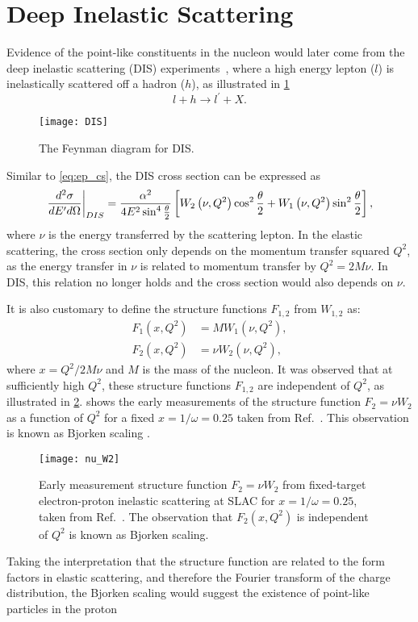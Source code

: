 \documentclass[../main.tex]{subfiles}
\begin{document}
\section{Deep Inelastic Scattering}
\label{sec:dis}
Evidence of the point-like constituents in the nucleon would later come from the deep
inelastic scattering (DIS) experiments~\cite{breidenbach1969}, where a high
energy lepton ($l$) is inelastically scattered off a hadron ($h$), as
illustrated in \cref{fig:DIS}
\begin{equation}
	l + h \rightarrow l^\prime + X.
\end{equation}
\begin{figure}[htbp!]
	\centering
	\texttt{[image: DIS]}
	\caption{The Feynman diagram for DIS.}
	\label{fig:DIS}
\end{figure}
Similar to \cref{eq:ep_cs}, the DIS cross section can be expressed as
\begin{equation}
	\eval{\frac{d^2\sigma}{dE^\prime d\Omega}}_{DIS} = \frac{\alpha^2}{4E^2 \sin^4
		\frac{\theta}{2}} \left[ W_2\left(\nu,Q^2\right)\cos^2
		\frac{\theta}{2} + W_1\left(\nu,Q^2\right)\sin^2 \frac{\theta}{2}
		\right],
	\label{eq:DIS_cs1}
\end{equation}
where $\nu$ is the energy transferred by the scattering lepton.
In the elastic scattering, the cross section only depends on the momentum transfer squared $Q^2$,
as the energy transfer in $\nu$ is related to momentum transfer by $Q^2=2M\nu$.
In DIS, this relation no longer holds and the cross section would also depends on $\nu$.

It is also customary to define the structure functions $F_{1,2}$ from $W_{1,2}$ as:
\begin{equation}
	\begin{split}
		F_1\left(x,Q^2\right) &= MW_1\left(\nu,Q^2\right),\\
		F_2\left(x,Q^2\right) &= \nu W_2\left(\nu,Q^2\right),
	\end{split}
\end{equation}
where $x=Q^2/2M\nu$ and $M$ is the mass of the nucleon. It was observed that at sufficiently high $Q^2$,
these structure functions $F_{1,2}$ are independent of $Q^2$, as illustrated in
\cref{fig:w2}.  shows the early measurements of the
structure function $F_2=\nu W_2$ as a function of $Q^2$ for a fixed
$x=1/\omega=0.25$ taken from Ref.~\cite{friedman1972}. This observation is
known as Bjorken scaling \cite{bjorken1969}.
\begin{figure}[htpb!]
	\centering
	\texttt{[image: nu\_W2]}
	\caption{Early measurement structure function $F_2=\nu W_2$ from
		fixed-target electron-proton inelastic scattering at SLAC for
		$x=1/\omega=0.25$, taken from Ref.~\cite{friedman1972}. The observation
		that $F_2(x,Q^2)$ is independent of $Q^2$ is known as Bjorken scaling. }
	\label{fig:w2}
\end{figure}
Taking the interpretation that the structure function are related to the form factors in elastic scattering,
and therefore the Fourier transform of the charge distribution, the Bjorken scaling would suggest
the existence of point-like particles in the proton
\end{document}
